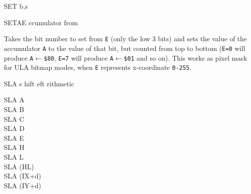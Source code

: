\begin{basedescript}{
    \desclabelstyle{\multilinelabel}
    \desclabelwidth{3cm}}
\begin{DetailItem}{SET b,s}
\begin{multicols}{2}
        \end{multicols}

        \begin{DetailEffects}
            \FlagsSETr
        \end{DetailEffects}			

        \begin{DetailTiming}
        \end{DetailTiming}

    \end{DetailItem}

    \begin{DetailItem}{SETAE\ZXN}
        { ccumulator from }
        {\SymSETAE}

        Takes the bit number to set from {\tt E} (only the low 3 bits) and sets the value of the accumulator {\tt A} to the value of that bit, but counted from top to bottom ({\tt E=0} will produce {\tt A$\leftarrow$\$80}, {\tt E=7} will produce {\tt A$\leftarrow$\$01} and so on). This works as pixel mask for ULA bitmap modes, when {\tt E} represents x-coordinate {\tt 0-255}.

        \begin{DetailEffects}
            \FlagsSETAE
        \end{DetailEffects}
						
        \begin{DetailTiming}
        \end{DetailTiming}

    \end{DetailItem}

    \pagebreak
    \begin{DetailItem}{SLA s}
        {hift eft rithmetic}
        {}
		
        \begin{DetailVariants}
            SLA A\\
            SLA B\\
            SLA C\\
            SLA D\\
            SLA E\\
            SLA H\\
            SLA L\\
            SLA (HL)\\
            SLA (IX+d)\\
            SLA (IY+d)


\end{DetailVariants}
\end{DetailItem}
\end{basedescript}
